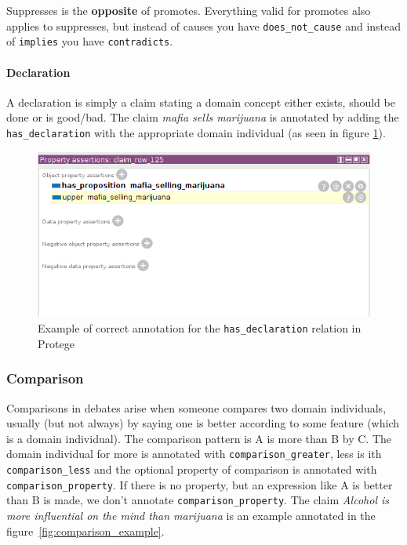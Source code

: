 Suppresses is the \textbf{opposite} of promotes. Everything valid for promotes
also applies to suppresses, but instead of causes you have
\texttt{does\_not\_cause} and instead of \texttt{implies} you have \texttt{contradicts}.

\paragraph{Declaration}

A declaration is simply a claim stating a domain concept either exists, should
be done or is good/bad. The claim \textit{mafia sells marijuana} is annotated by adding
the \texttt{has\_declaration} with the appropriate domain individual (as seen in figure
\ref{fig:declaration_example}). 

\begin{figure}
	\includegraphics[scale=0.8]{has_declaration.png}
	\caption{Example of correct annotation for the \texttt{has\_declaration} relation in Protege}
\label{fig:declaration_example}
\end{figure}

\subsubsection{Comparison}

Comparisons in debates arise when someone compares two domain individuals,
usually (but not always) by saying one is better according to some feature
(which is a domain individual). The comparison pattern is A is more than B by
C. The domain individual for more is annotated with
\texttt{comparison\_greater}, less is ith \texttt{comparison\_less} and the
optional property of comparison is annotated with
\texttt{comparison\_property}. If there is no property, but an expression like
A is better than B is made, we don’t annotate \texttt{comparison\_property}.
The claim \textit{Alcohol is more influential on the mind than marijuana} is an
example annotated in the figure~\ref{fig:comparison_example}.

